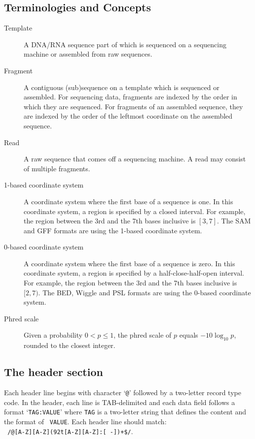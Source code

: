 \documentclass[10pt]{article}
\begin{document}
\subsection{Terminologies and Concepts}

\begin{description}
\item[Template] A DNA/RNA sequence part of which is sequenced on a
  sequencing machine or assembled from raw sequences.
\item[Fragment] A contiguous (sub)sequence on a template which is
  sequenced or assembled. For sequencing data, fragments are indexed by
  the order in which they are sequenced. For fragments of an assembled
  sequence, they are indexed by the order of the leftmost coordinate on
  the assembled sequence.
\item[Read] A raw sequence that comes off a sequencing machine. A read
  may consist of multiple fragments.
\item[1-based coordinate system] A coordinate system where the first
  base of a sequence is one. In this coordinate system, a region is
  specified by a closed interval. For example, the region between the 3rd
  and the 7th bases inclusive is $[3,7]$. The SAM and GFF formats are
  using the 1-based coordinate system.
\item[0-based coordinate system] A coordinate system where the first
  base of a sequence is zero. In this coordinate system, a region is
  specified by a half-close-half-open interval. For example, the region
  between the 3rd and the 7th bases inclusive is $[2,7)$. The BED,
  Wiggle and PSL formats are using the 0-based coordinate system.
\item[Phred scale] Given a probability $0<p\le 1$, the phred scale of $p$
  equals $-10\log_{10}p$, rounded to the closest integer.
\end{description}

\subsection{The header section}
Each header line begins with character `{\tt @}' followed by a
two-letter record type code. In the header, each line is TAB-delimited
and each data field follows a format `{\tt TAG:VALUE}' where {\tt TAG}
is a two-letter string that defines the content and the format of {\tt
  VALUE}. Each header line should match:\\ {\tt
  /@[A-Z][A-Z](\char92t[A-Z][A-Z]:[ -])+\$/}.
\end{document}
